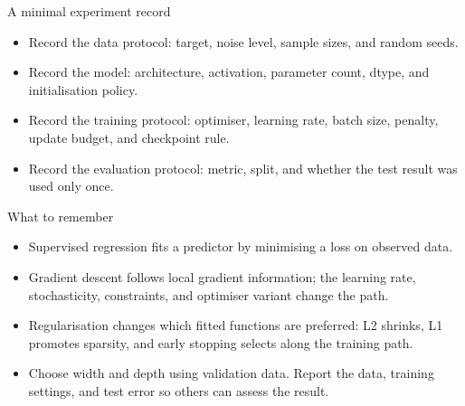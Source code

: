 \documentclass[aspectratio=43,11pt]{beamer}
\newcommand{\slideid}{L2}
\newenvironment{slideitems}{\small\begin{itemize}\setlength\itemsep{0.45em}}{\end{itemize}}
\begin{document}
\renewcommand{\slideid}{L2-S79}
\begin{frame}[t]{A minimal experiment record}
\begin{slideitems}
\item Record the data protocol: target, noise level, sample sizes, and random seeds.
\item Record the model: architecture, activation, parameter count, dtype, and initialisation policy.
\item Record the training protocol: optimiser, learning rate, batch size, penalty, update budget, and checkpoint rule.
\item Record the evaluation protocol: metric, split, and whether the test result was used only once.
\end{slideitems}
\end{frame}

\renewcommand{\slideid}{L2-S80}
\begin{frame}[t]{What to remember}
\begin{slideitems}
\item Supervised regression fits a predictor by minimising a loss on observed data.
\item Gradient descent follows local gradient information; the learning rate, stochasticity, constraints, and optimiser variant change the path.
\item Regularisation changes which fitted functions are preferred: L2 shrinks, L1 promotes sparsity, and early stopping selects along the training path.
\item Choose width and depth using validation data. Report the data, training settings, and test error so others can assess the result.
\end{slideitems}
\end{frame}
\end{document}
